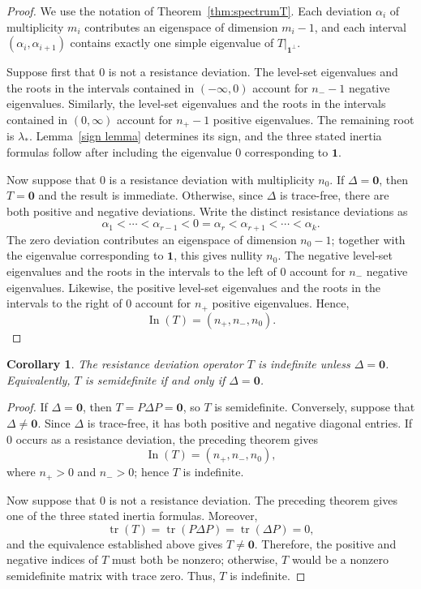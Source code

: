 \documentclass[12pt,a4paper]{amsart}
\newtheorem{corollary}[theorem]{Corollary}
\theoremstyle{remark}
\theoremstyle{definition}
\newcommand{\1}{\mathbf{1}}
\newcommand{\0}{\mathbf{0}}
\begin{document}
\begin{proof}
We use the notation of Theorem~\ref{thm:spectrumT}. Each deviation
$\alpha_i$ of multiplicity $m_i$ contributes an eigenspace of dimension
$m_i-1$, and each interval $(\alpha_i,\alpha_{i+1})$ contains exactly
one simple eigenvalue of $\left.T\right|_{\mathbf{1}^{\perp}}$.

Suppose first that $0$ is not a resistance deviation. The level-set
eigenvalues and the roots in the intervals contained in
$(-\infty,0)$ account for $n_--1$ negative eigenvalues. Similarly,
the level-set eigenvalues and the roots in the intervals contained in
$(0,\infty)$ account for $n_+-1$ positive eigenvalues. The remaining
root is $\lambda_*$. Lemma~\ref{sign lemma} determines its sign, and
the three stated inertia formulas follow after including the eigenvalue
$0$ corresponding to $\mathbf{1}$.

Now suppose that $0$ is a resistance deviation with multiplicity $n_0$.
If $\Delta=\mathbf{0}$, then $T=\mathbf{0}$ and the result is immediate.
Otherwise, since $\Delta$ is trace-free, there are both positive and
negative deviations. Write the distinct resistance deviations as
\[
\alpha_1<\cdots<\alpha_{r-1}<0=\alpha_r
<\alpha_{r+1}<\cdots<\alpha_k.
\]
The zero deviation contributes an eigenspace of dimension $n_0-1$;
together with the eigenvalue corresponding to $\mathbf{1}$, this gives
nullity $n_0$. The negative level-set eigenvalues and the roots in the
intervals to the left of $0$ account for $n_-$ negative eigenvalues.
Likewise, the positive level-set eigenvalues and the roots in the
intervals to the right of $0$ account for $n_+$ positive eigenvalues.
Hence,
\[
\operatorname{In}(T)=(n_+,n_-,n_0).
\]
\end{proof}

\begin{corollary}\label{indefiniteness}
The resistance deviation operator $T$ is indefinite unless
$\Delta=\mathbf{0}$. Equivalently, $T$ is semidefinite if and only if
$\Delta=\mathbf{0}$.
\end{corollary}

\begin{proof}
If $\Delta=\mathbf{0}$, then $T=P\Delta P=\mathbf{0}$, so $T$ is
semidefinite. Conversely, suppose that $\Delta\neq\mathbf{0}$. Since
$\Delta$ is trace-free, it has both positive and negative diagonal
entries. If $0$ occurs as a resistance deviation, the preceding theorem
gives
\[
\operatorname{In}(T)=(n_+,n_-,n_0),
\]
where $n_+>0$ and $n_->0$; hence $T$ is indefinite.

Now suppose that $0$ is not a resistance deviation. The preceding
theorem gives one of the three stated inertia formulas. Moreover,
\[
\operatorname{tr}(T)
=
\operatorname{tr}(P\Delta P)
=
\operatorname{tr}(\Delta P)
=0,
\]
and the equivalence established above gives $T\neq\mathbf{0}$. Therefore,
the positive and negative indices of $T$ must both be nonzero; otherwise,
$T$ would be a nonzero semidefinite matrix with trace zero. Thus, $T$ is
indefinite.
\end{proof}
\end{document}
